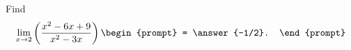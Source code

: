 \documentclass{ximera}
\author{Gregory Hartman \and Matthew Carr}
\begin{document}
\begin{exercise}



Find 
\[
\lim_{x\to2}\left({\frac{x^2-6x+9}{x^2-3x}}\right)
\begin{prompt}
= \answer{-1/2}.
\end{prompt}
\]

\end{exercise}
\end{document}
